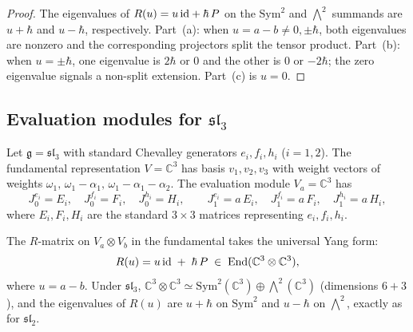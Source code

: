 \begin{proof}
The eigenvalues of $R(u)=u\,\mathrm{id}+\hbar\, P$ on the
$\mathrm{Sym}^2$ and $\bigwedge^2$ summands are
$u+\hbar$ and $u-\hbar$, respectively. Part~(a):
when $u=a-b\neq 0,\pm\hbar$, both eigenvalues are nonzero
and the corresponding projectors split the tensor product.
Part~(b): when $u=\pm\hbar$, one eigenvalue is $2\hbar$
or $0$ and the other is $0$ or $-2\hbar$; the zero
eigenvalue signals a non-split extension. Part~(c) is
$u=0$.
\end{proof}

\subsection{Evaluation modules for $\mathfrak{sl}_3$}

\begin{computation}
\label{comp:sl3-eval-fundamental}
Let $\mathfrak{g}=\mathfrak{sl}_3$ with standard Chevalley
generators $e_i,f_i,h_i$ ($i=1,2$). The fundamental
representation $V=\mathbb{C}^3$ has basis $v_1,v_2,v_3$
with weight vectors of weights $\omega_1,\,\omega_1-\alpha_1,\,
\omega_1-\alpha_1-\alpha_2$. The evaluation module
$V_a=\mathbb{C}^3$ has
\[
J^{e_i}_0=E_i,\quad J^{f_i}_0=F_i,\quad J^{h_i}_0=H_i,
\qquad
J^{e_i}_1=a\,E_i,\quad J^{f_i}_1=a\,F_i,\quad J^{h_i}_1=a\,H_i,
\]
where $E_i,F_i,H_i$ are the standard $3\times 3$ matrices
representing $e_i,f_i,h_i$.

The $R$-matrix on $V_a\otimes V_b$ in the fundamental takes
the universal Yang form:
\begin{equation}\label{eq:sl3-R-fund}
R(u)
=
u\,\mathrm{id}\;+\;\hbar\,P
\;\in\;
\operatorname{End}(\mathbb{C}^3\otimes\mathbb{C}^3),
\end{equation}
where $u=a-b$. Under $\mathfrak{sl}_3$,
$\mathbb{C}^3\otimes\mathbb{C}^3
\simeq\mathrm{Sym}^2(\mathbb{C}^3)\oplus\bigwedge^2(\mathbb{C}^3)$
\textup{(}dimensions $6+3$\textup{)}, and the eigenvalues of
$R(u)$ are $u+\hbar$ on $\mathrm{Sym}^2$ and $u-\hbar$
on $\bigwedge^2$, exactly as for $\mathfrak{sl}_2$.
\end{computation}

